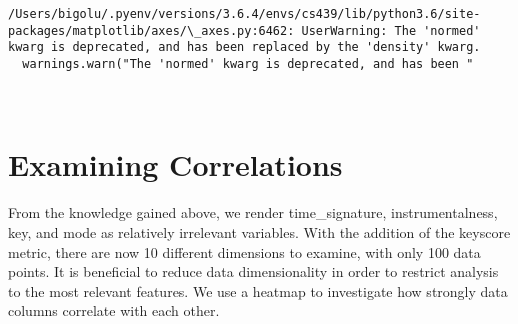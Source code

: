 \documentclass[11pt]{article}
\begin{document}
    \begin{Verbatim}[commandchars=\\\{\}]
/Users/bigolu/.pyenv/versions/3.6.4/envs/cs439/lib/python3.6/site-packages/matplotlib/axes/\_axes.py:6462: UserWarning: The 'normed' kwarg is deprecated, and has been replaced by the 'density' kwarg.
  warnings.warn("The 'normed' kwarg is deprecated, and has been "

    \end{Verbatim}

    \begin{center}
    \end{center}
    { \hspace*{\fill} \\}
    
    \hypertarget{examining-correlations}{%
\section{Examining Correlations}\label{examining-correlations}}

From the knowledge gained above, we render time\_signature,
instrumentalness, key, and mode as relatively irrelevant variables. With
the addition of the keyscore metric, there are now 10 different
dimensions to examine, with only 100 data points. It is beneficial to
reduce data dimensionality in order to restrict analysis to the most
relevant features. We use a heatmap to investigate how strongly data
columns correlate with each other.
\end{document}
